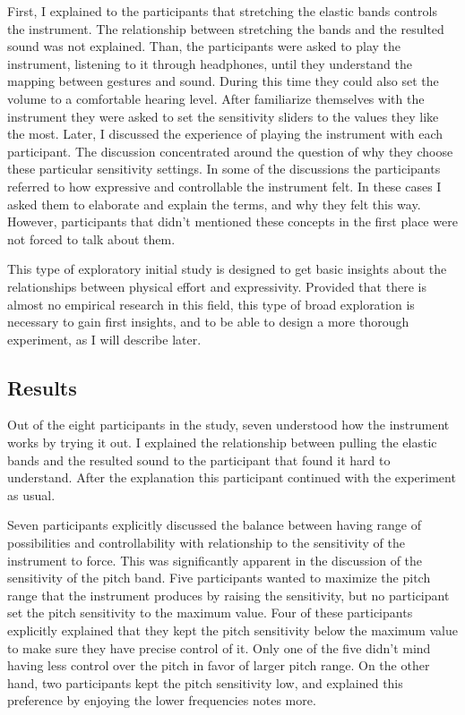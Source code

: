 \documentclass{sigchi}
\begin{document}
First, I explained to the participants that stretching the elastic bands controls the instrument.
The relationship between stretching the bands and the resulted sound was not explained.
Than, the participants were asked to play the instrument, listening to it through headphones, until they understand the mapping between gestures and sound.
During this time they could also set the volume to a comfortable hearing level.
After familiarize themselves with the instrument they were asked to set the sensitivity sliders to the values they like the most.
Later, I discussed the experience of playing the instrument with each participant.
The discussion concentrated around the question of why they choose these particular sensitivity settings.
In some of the discussions the participants referred to how expressive and controllable the instrument felt.
In these cases I asked them to elaborate and explain the terms, and why they felt this way.
However, participants that didn't mentioned these concepts in the first place were not forced to talk about them.

This type of exploratory initial study is designed to get basic insights about the relationships between physical effort and expressivity.
Provided that there is almost no empirical research in this field, this type of broad exploration is necessary to gain first insights, and to be able to design a more thorough experiment, as I will describe later.

\subsection{Results}

Out of the eight participants in the study, seven understood how the instrument works by trying it out.
I explained the relationship between pulling the elastic bands and the resulted sound to the participant that found it hard to understand.
After the explanation this participant continued with the experiment as usual.

Seven participants explicitly discussed the balance between having range of possibilities and controllability with relationship to the sensitivity of the instrument to force.
This was significantly apparent in the discussion of the sensitivity of the pitch band.
Five participants wanted to maximize the pitch range that the instrument produces by raising the sensitivity, but no participant set the pitch sensitivity to the maximum value.
Four of these participants explicitly explained that they kept the pitch sensitivity below the maximum value to make sure they have precise control of it.
Only one of the five didn't mind having less control over the pitch in favor of larger pitch range.
On the other hand, two participants kept the pitch sensitivity low, and explained this preference by enjoying the lower frequencies notes more.
\end{document}
